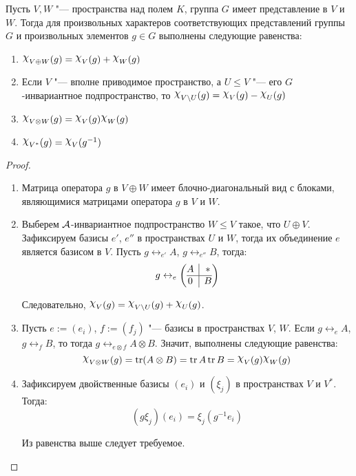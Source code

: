 \begin{proposition}
	Пусть $V, W$ "--- пространства над полем $K$, группа $G$ имеет представление в $V$ и $W$. Тогда для произвольных характеров соответствующих представлений группы $G$ и произвольных элементов $g \in G$ выполнены следующие равенства:
	\begin{enumerate}
		\item $\Chi_{V \oplus W}(g) = \Chi_V(g) + \Chi_W(g)$
		
		\item Если $V$ "--- вполне приводимое пространство, а $U \le V$ "--- его $G$-инвариантное подпространство, то $\Chi_{V \bs U}(g) = \Chi_V(g) - \Chi_U(g)$
		
		\item $\Chi_{V \otimes W}(g) = \Chi_V(g)\Chi_W(g)$
		
		\item $\Chi_{V^*}(g) = \Chi_V(g^{-1})$
		
	\end{enumerate}
	
	\begin{proof}~
		\begin{enumerate}
			\item Матрица оператора $g$ в $V \oplus W$ имеет блочно-диагональный вид с блоками, являющимися матрицами оператора $g$ в $V$ и $W$.
			
			\item Выберем $\mathcal A$-инвариантное подпространство $W \le V$ такое, что $U \oplus V$. Зафиксируем базисы $e'$, $e''$ в пространствах $U$ и $W$, тогда их объединение $e$ является базисом в $V$. Пусть $g \leftrightarrow_{e'} A$, $g \leftrightarrow_{e''} B$, тогда:
			\[g \leftrightarrow_e \left(\begin{array}{@{}c|c@{}}
					A & *\\
					\hline
					0 & B
				\end{array}\right)\]
			
			Следовательно, $\Chi_V(g) = \Chi_{V \bs U}(g) + \Chi_U(g)$.
			
			\item Пусть $e := (e_i)$, $f := (f_j)$ "--- базисы в пространствах $V$, $W$. Если $g \leftrightarrow_{e} A$, $g \leftrightarrow_{f} B$, то тогда $g \leftrightarrow_{e \otimes f} A \otimes B$. Значит, выполнены следующие равенства:
			\[\Chi_{V \otimes W}(g) = \tr(A \otimes B) = \tr{A}\tr{B}=\Chi_V(g)\Chi_W(g)\]
			
			\item Зафиксируем двойственные базисы $(e_i)$ и $(\xi_j)$ в пространствах $V$ и $V^*$. Тогда:
			\[(g\xi_j)(e_i) = \xi_j(g^{-1} e_i)\]
			
			Из равенства выше следует требуемое.
		\end{enumerate}
	\end{proof}
\end{proposition}